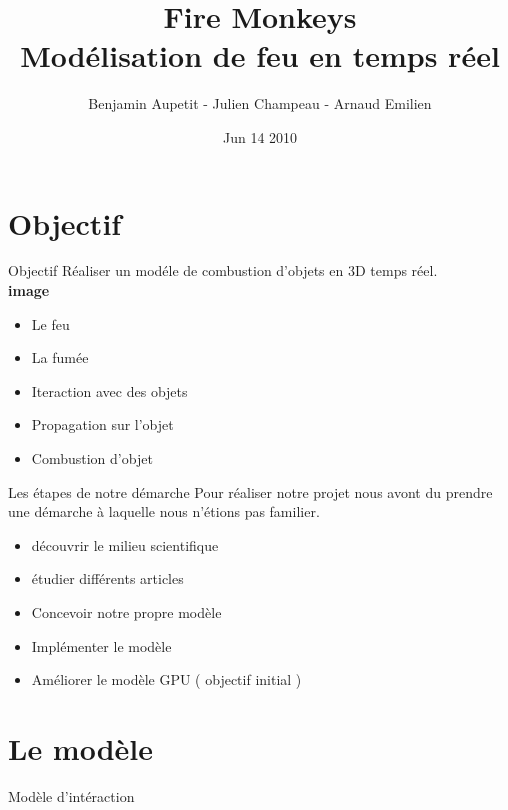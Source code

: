 \documentclass{beamer}
\title{Fire Monkeys\\ Modélisation de feu en temps réel}
\author{Benjamin Aupetit - Julien Champeau - Arnaud Emilien}
\date{Jun 14 2010}
\begin{document}
\begin{frame}
   \titlepage
\end{frame}

\begin{frame}
  \tableofcontents
\end{frame}

\section{Objectif}
\begin{frame}{Objectif}
  Réaliser un modéle de combustion d'objets en 3D temps réel.\\
  \textbf{image}
  \begin{itemize}
    \item{Le feu}%
    \item{La fumée}%
    \item{Iteraction avec des objets}%
    \item{Propagation sur l'objet}%
    \item{Combustion d'objet}%
  \end{itemize}
\end{frame}

\begin{frame}{Les étapes de notre démarche}
  Pour réaliser notre projet nous avont du prendre une démarche à laquelle nous n'étions pas familier.\\
  \begin{itemize}
  \item{découvrir le milieu scientifique} %
  \item{étudier différents articles} %
  \item{Concevoir notre propre modèle} %
  \item{Implémenter le modèle} %
  \item{Améliorer le modèle} GPU ( objectif initial ) %
  \end{itemize}
\end{frame}

\section{Le modèle}
\begin{frame}{Modèle d'intéraction}
\end{frame}
\end{document}

